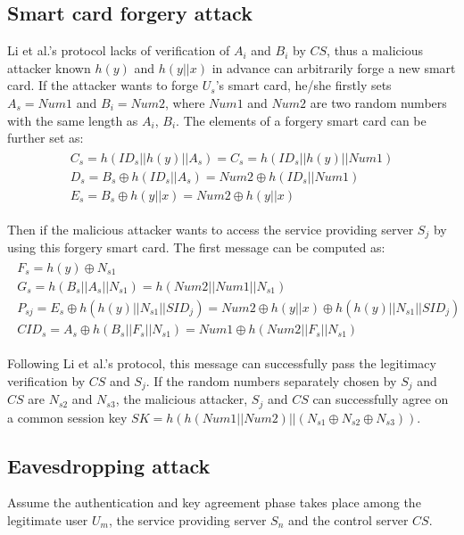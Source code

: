 \documentclass[preprint,12pt]{elsarticle}
\begin{document}
\subsection{Smart card forgery attack}
Li et al.'s protocol lacks of verification of $A_i$ and $B_i$ by $CS$, thus a malicious attacker known $h(y)$ and $h(y||x)$ in advance can arbitrarily forge a new smart card. If the attacker wants to forge $U_s$'s smart card, he/she firstly sets $A_s=Num1$ and $B_i=Num2$, where $Num1$ and $Num2$ are two random numbers with the same length as $A_i$, $B_i$. The elements of a forgery smart card can be further set as:
\begin{eqnarray}
\left.\begin{array}{l}
C_s=h(ID_s||h(y)||A_s)=C_s=h(ID_s||h(y)||Num1)\\
D_s=B_s\oplus h(ID_s||A_s)=Num2\oplus h(ID_s||Num1)\\
E_s=B_s\oplus h(y||x)=Num2\oplus h(y||x)
 \end{array} \right.
\end{eqnarray}

Then if the malicious attacker wants to access the service providing server $S_j$ by using this forgery smart card. The first message can be computed as:
\begin{eqnarray}
\left.\begin{array}{l}
F_s=h(y)\oplus N_{s1}\\
G_s=h(B_s||A_s||N_{s1})=h(Num2||Num1||N_{s1})\\
P_{sj}=E_s\oplus h(h(y)||N_{s1}||SID_j)=Num2\oplus h(y||x)\oplus h(h(y)||N_{s1}||SID_j)\\
CID_s=A_s\oplus h(B_s||F_s||N_{s1})=Num1\oplus h(Num2||F_s||N_{s1})
 \end{array} \right.
\end{eqnarray}

Following Li et al.'s protocol, this message can successfully pass the legitimacy verification by $CS$ and $S_j$. If the random numbers separately chosen by $S_j$ and $CS$ are $N_{s2}$ and $N_{s3}$, the malicious attacker, $S_j$ and $CS$ can successfully agree on a common session key $SK=h(h(Num1||Num2)||(N_{s1}\oplus N_{s2}\oplus N_{s3}))$.

\subsection{Eavesdropping attack}
Assume the authentication and key agreement phase takes place among the legitimate user $U_m$, the service providing server $S_n$ and the control server $CS$.
\end{document}
